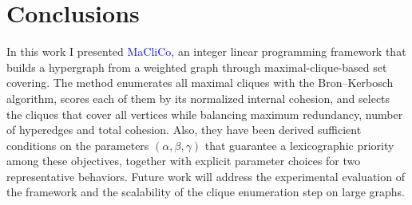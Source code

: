 \documentclass[10pt]{article} %
\begin{document}
\section{Conclusions}
In this work I presented \textcolor{blue}{MaCliCo}, an integer linear programming framework that builds a hypergraph from a weighted graph through maximal-clique-based set covering. The method enumerates all maximal cliques with the Bron--Kerbosch algorithm, scores each of them by its normalized internal cohesion, and selects the cliques that cover all vertices while balancing maximum redundancy, number of hyperedges and total cohesion. Also, they have been derived sufficient conditions on the parameters $(\alpha, \beta, \gamma)$ that guarantee a lexicographic priority among these objectives, together with explicit parameter choices for two representative behaviors. Future work will address the experimental evaluation of the framework and the scalability of the clique enumeration step on large graphs.
\end{document}
